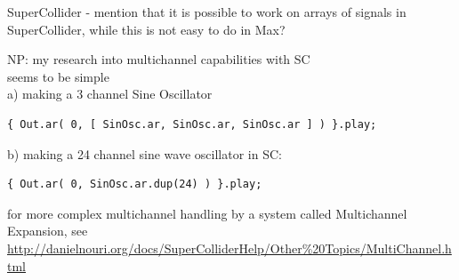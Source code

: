 \documentclass[twoside,a4paper]{article}
\begin{document}
 %




SuperCollider - mention that it is possible to work on arrays of signals in SuperCollider, while this is not easy to do in Max?



NP: my research into multichannel capabilities with SC\\
seems to be simple\\     
a) making a 3 channel  Sine Oscillator 

\begin{lstlisting}
{ Out.ar( 0, [ SinOsc.ar, SinOsc.ar, SinOsc.ar ] ) }.play;
\end{lstlisting}
b) making a 24 channel sine wave oscillator in SC:
\begin{lstlisting}
{ Out.ar( 0, SinOsc.ar.dup(24) ) }.play;
\end{lstlisting}  

for more complex multichannel handling by a system called Multichannel Expansion, see \url{http://danielnouri.org/docs/SuperColliderHelp/Other%20Topics/MultiChannel.html}
\end{document}
